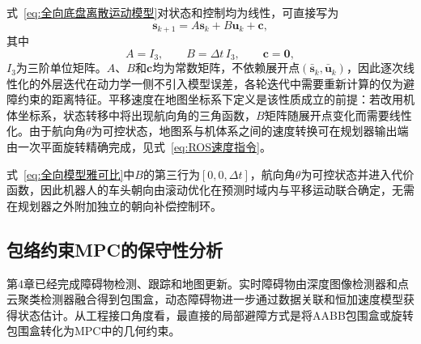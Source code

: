 式~\eqref{eq:全向底盘离散运动模型}对状态和控制均为线性，可直接写为
\begin{equation}
	\mathbf{s}_{k+1}
	=
	A\mathbf{s}_k+B\mathbf{u}_k+\mathbf{c},
	\label{eq:局部线性化模型}
\end{equation}
其中
\begin{equation}
	A=I_3,
	\qquad
	B=\Delta t\,I_3,
	\qquad
	\mathbf{c}=\mathbf{0},
	\label{eq:全向模型雅可比}
\end{equation}
$I_3$为三阶单位矩阵。$A$、$B$和$\mathbf c$均为常数矩阵，不依赖展开点$\left(\bar{\mathbf s}_k,\bar{\mathbf u}_k\right)$，因此逐次线性化的外层迭代在动力学一侧不引入模型误差，各轮迭代中需要重新计算的仅为避障约束的距离特征。平移速度在地图坐标系下定义是该性质成立的前提：若改用机体坐标系，状态转移中将出现航向角的三角函数，$B$矩阵随展开点变化而需要线性化。由于航向角$\theta$为可控状态，地图系与机体系之间的速度转换可在规划器输出端由一次平面旋转精确完成，见式~\eqref{eq:ROS速度指令}。

式~\eqref{eq:全向模型雅可比}中$B$的第三行为$\left[0,0,\Delta t\right]$，航向角$\theta$为可控状态并进入代价函数，因此机器人的车头朝向由滚动优化在预测时域内与平移运动联合确定，无需在规划器之外附加独立的朝向补偿控制环。

\subsection{包络约束MPC的保守性分析}
第4章已经完成障碍物检测、跟踪和地图更新。实时障碍物由深度图像检测器和点云聚类检测器融合得到包围盒，动态障碍物进一步通过数据关联和恒加速度模型获得状态估计。从工程接口角度看，最直接的局部避障方式是将AABB包围盒或旋转包围盒转化为MPC中的几何约束。

